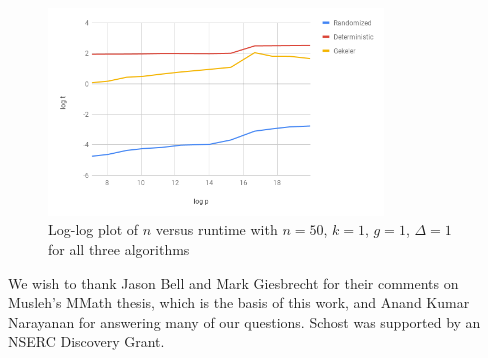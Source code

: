 \documentclass[sigconf]{acmart}
\begin{document}
\begin{figure}[h!]\label{fig:ptest50}
\centering
  \includegraphics[width=3.5in]{chart-50.png}
  \caption{Log-log plot of $n$ versus runtime with $n = 50$, $k = 1$, $g = 1$, $\Delta = 1$ for all three algorithms}
\end{figure}


\begin{acks}
  We wish to thank Jason Bell and Mark Giesbrecht for their comments
  on Musleh's MMath thesis, which is the basis of this work, and Anand
Kumar  Narayanan for answering many of our questions. Schost was supported
  by an NSERC Discovery Grant.
\end{acks}





\end{document}
